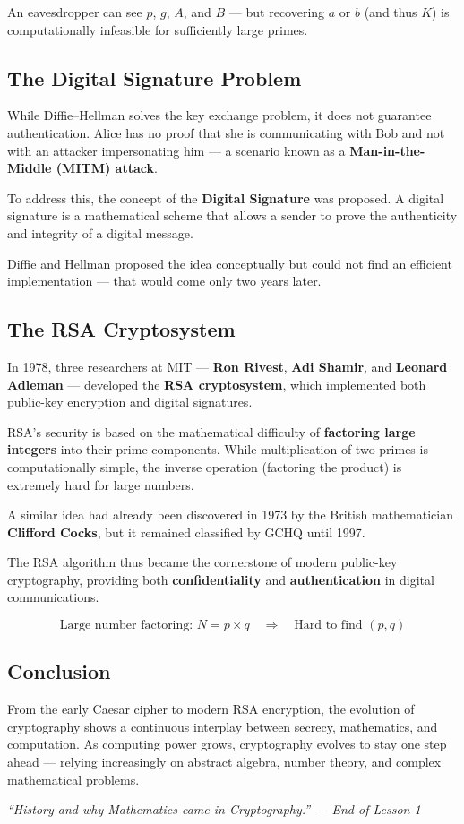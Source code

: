 An eavesdropper can see $p$, $g$, $A$, and $B$ — but recovering $a$ or $b$ (and thus $K$) is computationally infeasible for sufficiently large primes.

\subsection{The Digital Signature Problem}

While Diffie–Hellman solves the key exchange problem, it does not guarantee authentication.  
Alice has no proof that she is communicating with Bob and not with an attacker impersonating him — a scenario known as a \textbf{Man-in-the-Middle (MITM) attack}.

To address this, the concept of the \textbf{Digital Signature} was proposed.  
A digital signature is a mathematical scheme that allows a sender to prove the authenticity and integrity of a digital message.

Diffie and Hellman proposed the idea conceptually but could not find an efficient implementation — that would come only two years later.

\subsection{The RSA Cryptosystem}

In 1978, three researchers at MIT — \textbf{Ron Rivest}, \textbf{Adi Shamir}, and \textbf{Leonard Adleman} — developed the \textbf{RSA cryptosystem}, which implemented both public-key encryption and digital signatures.

RSA’s security is based on the mathematical difficulty of \textbf{factoring large integers} into their prime components.  
While multiplication of two primes is computationally simple, the inverse operation (factoring the product) is extremely hard for large numbers.

A similar idea had already been discovered in 1973 by the British mathematician \textbf{Clifford Cocks}, but it remained classified by GCHQ until 1997.

The RSA algorithm thus became the cornerstone of modern public-key cryptography, providing both \textbf{confidentiality} and \textbf{authentication} in digital communications.

\[
\text{Large number factoring: } N = p \times q \quad \Rightarrow \quad \text{Hard to find } (p, q)
\]

\subsection{Conclusion}

From the early Caesar cipher to modern RSA encryption, the evolution of cryptography shows a continuous interplay between secrecy, mathematics, and computation.  
As computing power grows, cryptography evolves to stay one step ahead — relying increasingly on abstract algebra, number theory, and complex mathematical problems.

\begin{center}
\textit{“History and why Mathematics came in Cryptography.” — End of Lesson 1}
\end{center}
